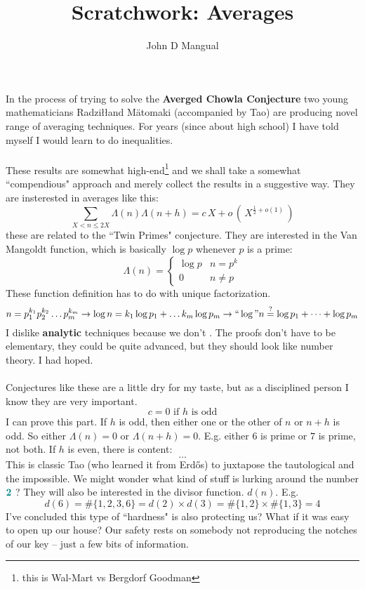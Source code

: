 \documentclass[12pt]{article}
\title{Scratchwork: Averages}
\author{John D Mangual}
\date{}
\begin{document}
\selectfont \fontsize{12.5}{15}\selectfont

\maketitle

\noindent In the process of trying to solve the \textbf{Averged Chowla Conjecture} two young mathematicians Radzi\l\l and M\"{a}tomaki (accompanied by Tao) are producing novel range of averaging techniques.   For years (since about high school) I have told myself I would learn to do inequalities. \\ \\
These results are somewhat high-end\footnote{this is Wal-Mart vs Bergdorf Goodman} and we shall take a somewhat ``compendious" approach and merely collect the results in a suggestive way.  They are insterested in averages like this:
$$ \sum_{X < n \leq 2X} \Lambda(n) \Lambda(n+h) = c \, X + o \,( \, X^{\frac{1}{2} + o(1)}\,) $$
these are related to the ``Twin Primes" conjecture.  They are interested in the Van Mangoldt function, which is basically $\log p$ whenever $p$ is a prime:
$$ \Lambda(n) = \left\{ 
\begin{array}{cc} \log p & n = p^k\\
0 & n \neq p \end{array}
 \right.  $$
These function definition has to do with unique factorization.  
$$ n = p_1^{k_1}p_2^{k_2} \dots p_m^{k_m} \to \log n = k_1 \log p_1 + \dots k_m \log p_m \to ``\log"n \stackrel{?}{=} \log p_1 + \dots + \log p_m $$
I dislike \textbf{analytic} techniques because we don't . The proofs don't have to be elementary, they could be quite advanced, but they should look like number theory.  I had hoped. \\ \\
Conjectures like these are a little dry for my taste, but as a disciplined person I know they are very important.
$$ c = 0 \text{ if } h \text{ is odd}$$
I can prove this part.  If $h$ is odd, then either one or the other of $n$ or $n+h$ is odd.  So either $\Lambda(n)= 0$ or $\Lambda(n+h) = 0$.  E.g. either $6$ is prime or $7$ is prime, not both.  If $h$ is even, there is content:
$$ \dots $$
This is classic Tao (who learned it from Erd\H{o}s) to juxtapose the tautological and the impossible.  We might wonder what kind of stuff is lurking around the number $\color{green!50!blue}{\mathbf{2}}$ ? They will also be interested in the divisor function. $d(n)$. E.g. 
$$d(6) = \# \{1,2,3,6  \}= d(2) \times d(3) = \# \{ 1 , 2 \} \times \# \{ 1, 3  \} = 4 $$
I've concluded this type of ``hardness" is also protecting us?  What if it was easy to open up our house?  Our safety rests on somebody not reproducing the notches of our key -- just a few bits of information. 
\end{document}
